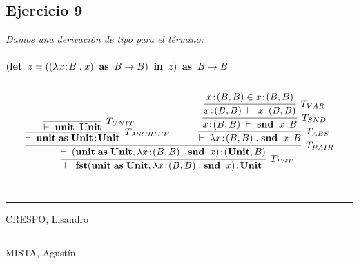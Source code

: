\documentclass[a4paper,10pt]{article}
\begin{document}
\subsection*{Ejercicio 9} 
	\emph{Damos una derivación de tipo para el término:
		\\
		\\ 
		\indent $({\bf let}\;\;z=((\lambda x\!:\!B\;.\;x)\;\;{\bf as}\;\;B \rightarrow B)\;\;{\bf in}\;\;z)\;\;{\bf as}\;\;B \rightarrow B$
	}
	\\
	\\
	\begin{align*}
		\infer[T_{FST}]{
			\vdash \; {\bf fst}({\bf unit} \;{\bf as}\; {\bf Unit},\lambda x\!:\!(B,B)\;.\;{\bf snd}\;\;x)\!:\!{\bf Unit}
		}{
			\infer[T_{PAIR}]
			{
				\vdash \; ({\bf unit} \;{\bf as}\; {\bf Unit},\lambda x\!:\!(B,B)\;.\;{\bf snd}\;\;x)\!:\!({\bf Unit}, B)
			}
			{
				\infer[T_{ASCRIBE}]
				{
					\vdash \; {\bf unit}\;{\bf as}\;{\bf Unit}\!:\!{\bf Unit}
				}
				{
					\infer[T_{UNIT}]
					{
						\vdash \; {\bf unit}\!:\!{\bf Unit}
					}
					{}
				} & \qquad
				\infer[T_{ABS}]
				{
					\vdash \; \lambda x\!:\!(B,B) \;.\;{\bf snd}\;\;x\!:\!B
				}
				{
					\infer[T_{SND}]
					{
						x\!:\!(B,B) \; \vdash \; {\bf snd} \;\; x\!:\!B
					}
					{
						\infer[T_{VAR}]
						{
							x\!:\!(B,B) \; \vdash \; x\!:\!(B,B)
						}{
							x\!:\!(B,B) \in x\!:\!(B,B)
						}
					}
				}
			}
		}
	\end{align*}
\\
\vspace{\fill}
\begin{multicols}{2}
	\hrule
	\vspace{5pt}
	CRESPO, Lisandro \\
	\linebreak
	\hrule
	\vspace{5pt}
	MISTA, Agustín \\
\end{multicols}
\end{document}
